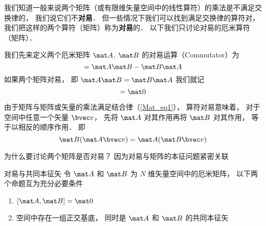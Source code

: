 


我们知道一般来说两个矩阵（或有限维矢量空间中的线性算符）的乘法是不满足交换律的， 我们说它们不\textbf{对易}． 但一些情况下我们可以找到满足交换律的算符对， 我们把这样的两个算符（矩阵）称为\textbf{对易}的． 以下我们只讨论对易的厄米算符（矩阵）．

我们先来定义两个厄米矩阵 $\mat A$, $\mat B$ 的对易运算（Commutator）为
\begin{equation}
[\mat A, \mat B] = \mat A \mat B - \mat B \mat A
\end{equation}
如果两个矩阵对易， 即 $\mat A \mat B = \mat B \mat A$ 我们就记
\begin{equation}
[\mat A, \mat B] = \mat 0
\end{equation}

由于矩阵与矩阵或矢量的乘法满足结合律（\autoref{Mat_eq1}）， 算符对易意味着， 对于空间中任意一个矢量 $\bvec v$， 先将 $\mat A$ 对其作用再将 $\mat B$ 对其作用， 等于以相反的顺序作用． 即
\begin{equation}\label{OpComu_eq1}
\mat B(\mat A \bvec v) = \mat A (\mat B \bvec v)
\end{equation}

为什么要讨论两个矩阵是否对易？ 因为对易与矩阵的本征问题紧密关联

\begin{theorem}{对易与共同本征矢}
令 $\mat A$ 和 $\mat B$ 为 $N$ 维矢量空间中的厄米矩阵， 以下两个命题互为充分必要条件
\begin{enumerate}
\item $[\mat A, \mat B] = \mat 0$
\item 空间中存在一组正交基底， 同时是 $\mat A$ 和 $\mat B$ 的共同本征矢
\end{enumerate}
\end{theorem}

